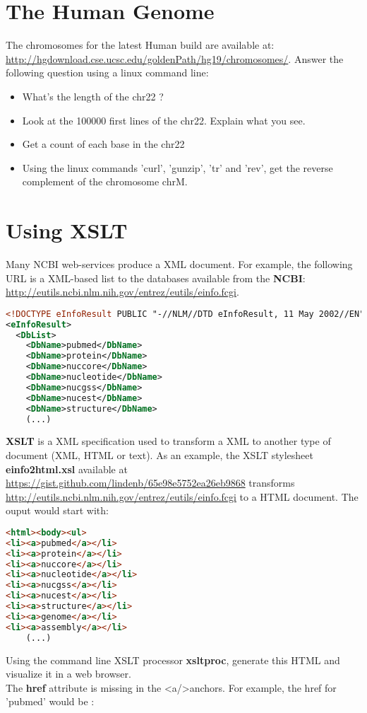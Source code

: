 \documentclass{article}
\begin{document}
\section{The Human Genome}

The chromosomes for the latest Human build are available at: \url{http://hgdownload.cse.ucsc.edu/goldenPath/hg19/chromosomes/}. Answer the following question using a linux command line:
\begin{itemize}
\item What's the length of the chr22 ?
\item Look at the 100000 first lines of the chr22. Explain what you see.
\item Get a count of each base in the chr22
\item Using the linux commands 'curl', 'gunzip', 'tr' and 'rev', get the reverse complement of the chromosome chrM.
\end{itemize}


\section{Using XSLT}
Many NCBI web-services produce a XML document. For example, the following URL is a XML-based list to the databases available from the  \textbf{NCBI}: \url{http://eutils.ncbi.nlm.nih.gov/entrez/eutils/einfo.fcgi}.\\
\begin{lstlisting}[language=xml]
<!DOCTYPE eInfoResult PUBLIC "-//NLM//DTD eInfoResult, 11 May 2002//EN" "http://www.ncbi.nlm.nih.gov/entrez/query/DTD/eInfo_020511.dtd">
<eInfoResult>
  <DbList>
    <DbName>pubmed</DbName>
    <DbName>protein</DbName>
    <DbName>nuccore</DbName>
    <DbName>nucleotide</DbName>
    <DbName>nucgss</DbName>
    <DbName>nucest</DbName>
    <DbName>structure</DbName>
    (...)
\end{lstlisting}
\textbf{XSLT} is a XML specification used to transform a XML to another type of document (XML, HTML or text).
As an example, the XSLT stylesheet \textbf{einfo2html.xsl} available at \url{https://gist.github.com/lindenb/65e98e5752ea26eb9868} transforms  \url{http://eutils.ncbi.nlm.nih.gov/entrez/eutils/einfo.fcgi} to a HTML document. The ouput would start with:\\
\begin{lstlisting}[language=html]
<html><body><ul>
<li><a>pubmed</a></li>
<li><a>protein</a></li>
<li><a>nuccore</a></li>
<li><a>nucleotide</a></li>
<li><a>nucgss</a></li>
<li><a>nucest</a></li>
<li><a>structure</a></li>
<li><a>genome</a></li>
<li><a>assembly</a></li>
    (...)
\end{lstlisting} 
\noindent
Using the command line XSLT processor \textbf{xsltproc}, generate this HTML and visualize it in a web browser.\\
The \textbf{href} attribute is missing in the \textless{}a/\textgreater anchors. For example, the href for 'pubmed' would be :
\end{document}
